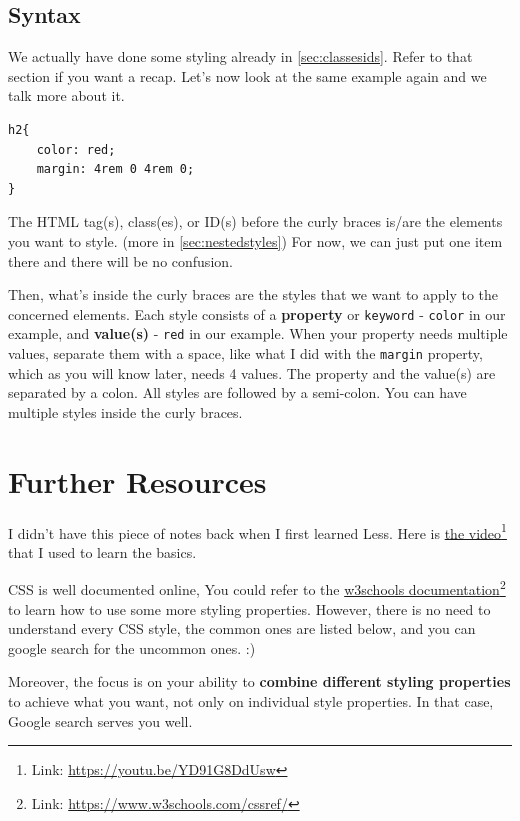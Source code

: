 \subsection*{Syntax}

We actually have done some styling already in \cref{sec:classesids}. Refer to that section if you want a recap.
Let's now look at the same example again and we talk more about it.

\begin{lstlisting}[language=pug]
h2{
    color: red;
    margin: 4rem 0 4rem 0;
}
\end{lstlisting}

The HTML tag(s), class(es), or ID(s) before the curly braces is/are the elements you want to style. (more in \cref{sec:nestedstyles}) For now, we can just put one item there and there will be no confusion.
\vspace{6mm}

Then, what's inside the curly braces are the styles that we want to apply to the concerned elements. Each style consists of a \textbf{property} or \texttt{keyword} - \texttt{color} in our example, and \textbf{value(s)} - \texttt{red} in our example. When your property needs multiple values, separate them with a space, like what I did with the \texttt{margin} property, which as you will know later, needs 4 values. The property and the value(s) are separated by a colon. All styles are followed by a semi-colon. You can have multiple styles inside the curly braces. 
\vspace{6mm}

\section*{Further Resources}

I didn't have this piece of notes back when I first learned Less. Here is \href{https://youtu.be/YD91G8DdUsw}{the video}\footnote{Link: \url{https://youtu.be/YD91G8DdUsw}} that I used to learn the basics. 

CSS is well documented online, You could refer to the \href{https://www.w3schools.com/cssref/}{w3schools documentation}\footnote{Link: \url{https://www.w3schools.com/cssref/}} to learn how to use some more styling properties. 
However, there is no need to understand every CSS style, the common ones are listed below, and you can google search for the uncommon ones. :)

Moreover, the focus is on your ability to \textbf{combine different styling properties} to achieve what you want, not only on individual style properties. In that case, Google search serves you well. 


